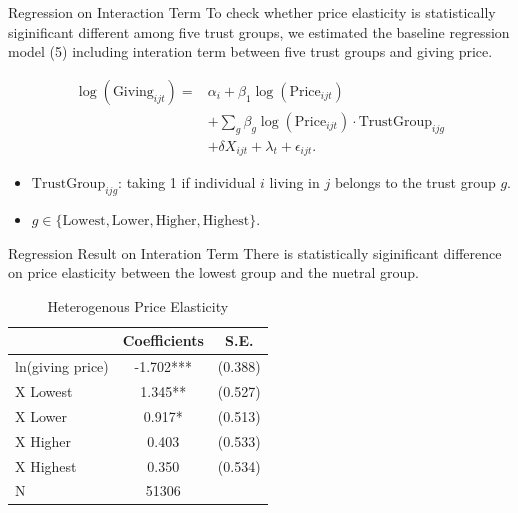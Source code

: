 \documentclass[
  ignorenonframetext,
]{beamer}
\providecommand{\tightlist}{%
  \setlength{\itemsep}{0pt}\setlength{\parskip}{0pt}}
\begin{document}
\begin{frame}{Regression on Interaction Term}
\protect\hypertarget{regression-on-interaction-term}{}
To check whether price elasticity is statistically siginificant different among five trust groups,
we estimated the baseline regression model (5) including interation term between five trust groups and giving price.

\begin{align*}
    \log(\text{Giving}_{ijt}) 
    =& \alpha_i + \beta_1 \log(\text{Price}_{ijt}) \\
    &+ \sum_g \beta_g \log(\text{Price}_{ijt}) \cdot \text{TrustGroup}_{ijg}  \\
    &+ \delta X_{ijt} + \lambda_t + \epsilon_{ijt}.
\end{align*}

\begin{itemize}
\tightlist
\item
  \(\text{TrustGroup}_{ijg}\): taking 1 if individual \(i\) living in \(j\) belongs to the trust group \(g\).
\item
  \(g \in \{ \text{Lowest}, \text{Lower}, \text{Higher}, \text{Highest} \}\).
\end{itemize}
\end{frame}

\begin{frame}{Regression Result on Interation Term}
\protect\hypertarget{regression-result-on-interation-term}{}
There is statistically siginificant difference on price elasticity between the lowest group and the nuetral group.

\begin{table}

\caption{\label{tab:kableEstimateInteractionByTrustGroup}Heterogenous Price Elasticity}
\centering
\begin{tabular}[t]{lcc}
\toprule
 & Coefficients & S.E.\\
\midrule
ln(giving price) & -1.702*** & (0.388)\\
\hspace{1em}X Lowest & 1.345** & (0.527)\\
\hspace{1em}X Lower & 0.917* & (0.513)\\
\hspace{1em}X Higher & 0.403 & (0.533)\\
\hspace{1em}X Highest & 0.350 & (0.534)\\
N & 51306 & \\
\bottomrule
\end{tabular}
\end{table}
\end{frame}
\end{document}
